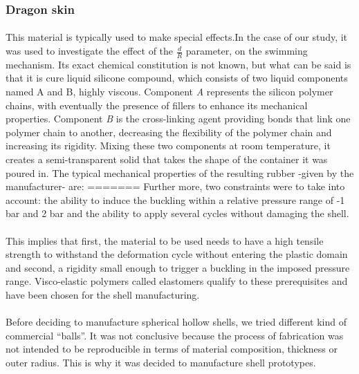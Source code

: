 \subsubsection{Dragon skin} 
\paragraph{}
This material is typically used to make special effects.In the case of our study, it was used to investigate the effect of the $\frac{d}{R}$ parameter, on the swimming mechanism. Its exact chemical constitution is not known, but what can be said is that it is cure liquid silicone compound, which consists of two liquid components named A and B, highly viscous. Component \emph{A} represents the silicon polymer chains, with eventually the presence of fillers to enhance its mechanical properties. Component \emph{B} is the cross-linking agent providing bonds that link one polymer chain to another, decreasing the flexibility of the polymer chain and increasing its rigidity. Mixing these two components at room temperature, it creates a semi-transparent solid that takes the shape of the container it was poured in.
The typical mechanical properties of the resulting rubber -given by the manufacturer- are:
=======
Further more, two constraints were to take into account: the ability to induce the buckling within a relative pressure range of -1 bar and 2 bar and the ability to apply several cycles without damaging the shell. 
\paragraph{}
This implies that first, the material to be used needs to have a high tensile strength to withstand the deformation cycle without entering the plastic domain and second, a rigidity small enough to trigger a buckling in the imposed pressure range. Visco-elastic polymers called elastomers qualify to these prerequisites and have been chosen for the shell manufacturing.
\paragraph{}
Before deciding to manufacture spherical hollow shells, we tried different kind of commercial "`balls"'. It was not conclusive because the process of fabrication was not intended to be reproducible in terms of material composition, thickness or outer radius. This is why it was decided to manufacture shell prototypes.
